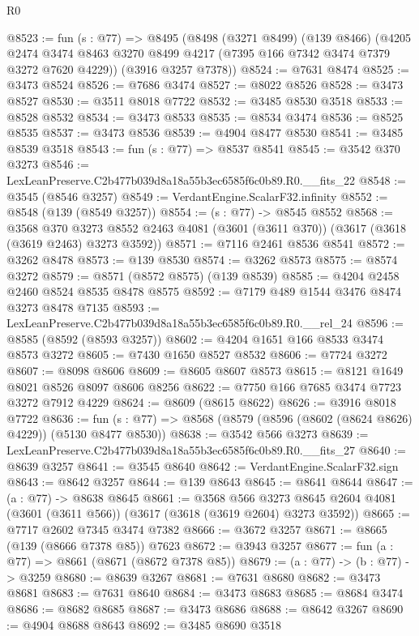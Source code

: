 \begin{lexlean}{R0}
\begin{coremodule}
@8523 := fun (s : @77) =>
  @8495
    (@8498
      (@3271 @8499)
      (@139 @8466)
      (@4205 @2474 @3474 @8463 @3270 @8499 @4217 (@7395 @166 @7342 @3474 @7379 @3272 @7620 @4229))
      (@3916 @3257 @7378))
@8524 := @7631 @8474
@8525 := @3473 @8524
@8526 := @7686 @3474
@8527 := @8022 @8526
@8528 := @3473 @8527
@8530 := @3511 @8018 @7722
@8532 := @3485 @8530 @3518
@8533 := @8528 @8532
@8534 := @3473 @8533
@8535 := @8534 @3474
@8536 := @8525 @8535
@8537 := @3473 @8536
@8539 := @4904 @8477 @8530
@8541 := @3485 @8539 @3518
@8543 := fun (s : @77) => @8537 @8541
@8545 := @3542 @370 @3273
@8546 := LexLeanPreserve.C2b477b039d8a18a55b3ec6585f6c0b89.R0.__fits_22
@8548 := @3545 (@8546 @3257)
@8549 := VerdantEngine.ScalarF32.infinity
@8552 := @8548 (@139 (@8549 @3257))
@8554 := (s : @77) -> @8545 @8552
@8568 := @3568
    @370
    @3273
    @8552
    @2463
    @4081
    (@3601 (@3611 @370))
    (@3617 (@3618 (@3619 @2463) @3273 @3592))
@8571 := @7116 @2461 @8536 @8541
@8572 := @3262 @8478
@8573 := @139 @8530
@8574 := @3262 @8573
@8575 := @8574 @3272
@8579 := @8571 (@8572 @8575) (@139 @8539)
@8585 := @4204 @2458 @2460 @8524 @8535 @8478 @8575
@8592 := @7179 @489 @1544 @3476 @8474 @3273 @8478 @7135
@8593 := LexLeanPreserve.C2b477b039d8a18a55b3ec6585f6c0b89.R0.__rel_24
@8596 := @8585 (@8592 (@8593 @3257))
@8602 := @4204 @1651 @166 @8533 @3474 @8573 @3272
@8605 := @7430 @1650 @8527 @8532
@8606 := @7724 @3272
@8607 := @8098 @8606
@8609 := @8605 @8607 @8573
@8615 := @8121 @1649 @8021 @8526 @8097 @8606 @8256
@8622 := @7750 @166 @7685 @3474 @7723 @3272 @7912 @4229
@8624 := @8609 (@8615 @8622)
@8626 := @3916 @8018 @7722
@8636 := fun (s : @77) => @8568 (@8579 (@8596 (@8602 (@8624 @8626) @4229)) (@5130 @8477 @8530))
@8638 := @3542 @566 @3273
@8639 := LexLeanPreserve.C2b477b039d8a18a55b3ec6585f6c0b89.R0.__fits_27
@8640 := @8639 @3257
@8641 := @3545 @8640
@8642 := VerdantEngine.ScalarF32.sign
@8643 := @8642 @3257
@8644 := @139 @8643
@8645 := @8641 @8644
@8647 := (a : @77) -> @8638 @8645
@8661 := @3568
    @566
    @3273
    @8645
    @2604
    @4081
    (@3601 (@3611 @566))
    (@3617 (@3618 (@3619 @2604) @3273 @3592))
@8665 := @7717 @2602 @7345 @3474 @7382
@8666 := @3672 @3257
@8671 := @8665 (@139 (@8666 @7378 @85)) @7623
@8672 := @3943 @3257
@8677 := fun (a : @77) => @8661 (@8671 (@8672 @7378 @85))
@8679 := (a : @77) -> (b : @77) -> @3259
@8680 := @8639 @3267
@8681 := @7631 @8680
@8682 := @3473 @8681
@8683 := @7631 @8640
@8684 := @3473 @8683
@8685 := @8684 @3474
@8686 := @8682 @8685
@8687 := @3473 @8686
@8688 := @8642 @3267
@8690 := @4904 @8688 @8643
@8692 := @3485 @8690 @3518

\end{coremodule}
\end{lexlean}
